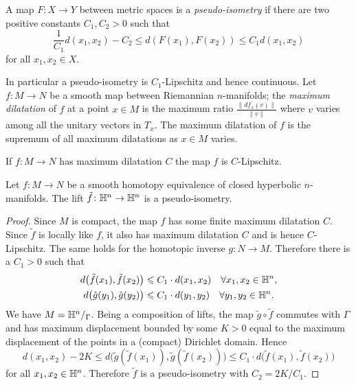 \begin{defn} A map $F\colon X \to Y$ between metric spaces is a \emph{pseudo-isometry} if there are two positive constants $C_1, C_2>0$ such that
$$\frac 1 {C_1} d(x_1,x_2) - C_2 \leqslant d(F(x_1), F(x_2)) \leqslant C_1d(x_1,x_2)$$
for all $x_1,x_2 \in X$.
\end{defn}
In particular a pseudo-isometry is $C_1$-Lipschitz and hence continuous. Let $f\colon M \to N$ be a smooth map between Riemannian $n$-manifolds; the \emph{maximum dilatation} of $f$ at a point $x\in M$ is the maximum ratio $\frac{\|df_x(v)\|}{\|v\|}$ where $v$ varies among all the unitary vectors in $T_x$. The maximum dilatation of $f$ is the supremum of all maximum dilatations as $x \in M$ varies. 

\begin{ex}
If $f\colon M\to N$ has maximum dilatation $C$ the map $f$ is $C$-Lipschitz.
\end{ex}

\begin{prop} \label{pseudo-isometria:prop}
Let $f\colon M\to N$ be a smooth homotopy equivalence of closed hyperbolic $n$-manifolds. The lift $\tilde f\colon \mathbb{H}^n \to \mathbb{H}^n$ is a pseudo-isometry.
\end{prop}
\begin{proof}
Since $M$ is compact, the map $f$ has some finite maximum dilatation $C$. Since $\tilde f$ is locally like $f$, it also has maximum dilatation $C$ and is hence $C$-Lipschitz. The same holds for the homotopic inverse $g\colon N\to M$. Therefore there is a $C_1>0$ such that
\begin{align*}
d\big(\tilde f(x_1), \tilde f(x_2)\big) & \leqslant C_1 \cdot d(x_1,x_2) \quad \forall x_1,x_2 \in \mathbb{H}^n, \\
d\big(\tilde g(y_1), \tilde g(y_2)\big) & \leqslant C_1 \cdot d(y_1,y_2) \quad \forall y_1,y_2 \in \mathbb{H}^n.
\end{align*}
We have $M = \mathbb{H}^n/_\Gamma$.
Being a composition of lifts, the map $\tilde g \circ \tilde f$ commutes with $\Gamma$ and has maximum displacement bounded by some $K>0$ equal to the maximum displacement of the points in a (compact) Dirichlet domain. Hence
$$d(x_1,x_2) - 2K \leqslant d\big( \tilde g (\tilde f(x_1)), \tilde g (\tilde f(x_2)) \big) \leqslant C_1 \cdot d\big(\tilde f(x_1), \tilde f(x_2)\big) $$
for all $x_1,x_2 \in \mathbb{H}^n$. Therefore $\tilde f$ is a pseudo-isometry with $C_2 = 2K/C_1$.
\end{proof}


